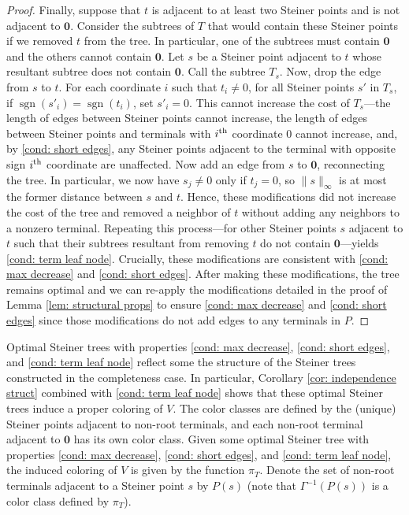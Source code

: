 \documentclass{theoretics}
\DeclareMathOperator{\sgn}{sgn}
\newcommand{\1}{\textbf{1}}
\begin{document}
\begin{proof}
Finally, suppose that $t$ is adjacent to at least two Steiner points and is not adjacent to $\mathbf{0}$. Consider the subtrees of $T$ that would contain these Steiner points if we removed $t$ from the tree. In particular, one of the subtrees must contain $\mathbf{0}$ and the others cannot contain $\mathbf{0}$. Let $s$ be a Steiner point adjacent to $t$ whose resultant subtree does not contain $\mathbf{0}$. Call the subtree $T_s$. Now, drop the edge from $s$ to $t$. For each coordinate $i$ such that $t_i \neq 0$, for all Steiner points $s'$ in $T_s$, if $\sgn(s'_i) = \sgn(t_i)$, set $s'_i = 0$. This cannot increase the cost of $T_s$—the length of edges between Steiner points cannot increase, the length of edges between Steiner points and terminals with $i\textsuperscript{th} $ coordinate $0$ cannot increase, and, by \ref{cond: short edges}, any Steiner points adjacent to the terminal with opposite sign $i\textsuperscript{th} $ coordinate are unaffected.  Now add an edge  from $s$ to $\mathbf{0}$, reconnecting the tree. In particular, we now have $s_j \neq 0$ only if $t_j = 0$, so $\|s \|_{\infty}$ is at most the former distance between $s$ and $t$. Hence, these modifications did not increase the cost of the tree and removed a neighbor of $t$ without adding any neighbors to a nonzero terminal. Repeating this process—for other Steiner points $s$ adjacent to $t$ such that their subtrees resultant from removing $t$ do not contain $\mathbf{0}$—yields \ref{cond: term leaf node}. Crucially, these modifications are consistent with \ref{cond: max decrease} and \ref{cond: short edges}. After making these modifications, the tree remains optimal and we can re-apply the modifications detailed in the proof of Lemma \ref{lem: structural props} to ensure  \ref{cond: max decrease} and \ref{cond: short edges} since those modifications do not add edges to any terminals in $P$.
\end{proof}

Optimal Steiner trees with properties 
\ref{cond: max decrease}, \ref{cond: short edges}, and \ref{cond: term leaf node} reflect some the structure of the Steiner trees constructed in the completeness case. In particular, Corollary \ref{cor: independence struct} combined with \ref{cond: term leaf node} shows that these optimal Steiner trees induce a proper coloring of $V$. The color classes are defined by the (unique) Steiner points adjacent to non-root terminals, and each non-root terminal adjacent to $\mathbf{0}$ has its own color class. Given some optimal Steiner tree with properties \ref{cond: max decrease}, \ref{cond: short edges}, and \ref{cond: term leaf node}, the induced coloring of $V$ is given by the function $\pi_T$. Denote the set of non-root terminals adjacent to a Steiner point $s$ by $P(s)$ (note that $\Gamma^{-1}(P(s))$ is a color class defined by $\pi_T$).
\end{document}
